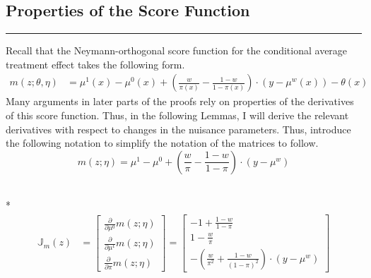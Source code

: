 \subsection{Properties of the Score Function}
\hrule

Recall that the Neymann-orthogonal score function for the conditional average treatment effect takes the following form.
\begin{equation}
    \begin{aligned}
        m\left(z; \theta, \eta\right)
		& = \mu^{1}\left(x\right) - \mu^{0}\left(x\right) 
        + \left(\frac{w}{\pi\left(x\right)} - \frac{1 - w}{1 - \pi\left(x\right)}\right) \cdot \left(y - \mu^{w}\left(x\right)\right) -  \theta\left(x\right)
	\end{aligned}
\end{equation}
Many arguments in later parts of the proofs rely on properties of the derivatives of this score function.
Thus, in the following Lemmas, I will derive the relevant derivatives with respect to changes in the nuisance parameters.
Thus, introduce the following notation to simplify the notation of the matrices to follow.
\begin{equation}
    m\left(z; \eta\right) = \mu^{1} - \mu^{0} + \left(\frac{w}{\pi} - \frac{1 - w}{1 - \pi}\right) \cdot \left(y - \mu^{w}\right)
\end{equation}

\begin{lem}\label{lem:score_jacobian}\mbox{}\\*
    \begin{equation}
        \begin{aligned}
            \mathbb{J}_{m}(z)
            & = \begin{bmatrix}
                \frac{\partial}{\partial \mu^{0}} m\left(z; \eta\right)\\
                \frac{\partial}{\partial \mu^{1}} m\left(z; \eta\right)\\
                \frac{\partial}{\partial \pi} m\left(z; \eta\right)
            \end{bmatrix} 
            = \begin{bmatrix}
                -1 + \frac{1 - w}{1 - \pi} \\
                1 - \frac{w}{\pi} \\
                -\left(\frac{w}{\pi^2} + \frac{1-w}{\left(1-\pi\right)^{2}}\right)  \cdot \left(y - \mu^{w}\right)
            \end{bmatrix} 
        \end{aligned}
    \end{equation}
\end{lem}

